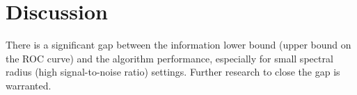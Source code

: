 \documentclass[conference,letterpaper]{IEEEtran}
\begin{document}
\section{Discussion}
There is a significant gap between the information lower bound (upper
bound on the ROC curve) and the algorithm performance, especially for
small spectral radius (high signal-to-noise ratio) settings.  Further
research to close the gap is warranted.




\iftoggle{isit}{%
\IEEEtriggeratref{10}
}{}%
\end{document}
